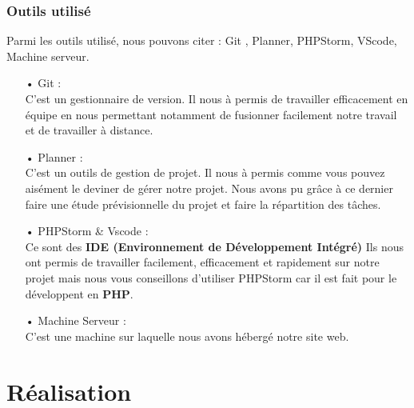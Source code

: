 \documentclass[14pt,a4paper]{article}
\begin{document}
\subsubsection{Outils utilisé}
Parmi les outils utilisé, nous pouvons citer : Git , Planner, PHPStorm, VScode, Machine serveur.
\begin{itemize}
\item[•] Git : \\
C'est un gestionnaire de version. Il nous à permis de travailler efficacement en équipe en nous
permettant notamment de fusionner facilement notre travail et de travailler à distance. 
\item[•] Planner : \\
C'est un outils de gestion de projet. Il nous à permis comme vous pouvez aisément le deviner de 
gérer notre projet. Nous avons pu grâce à ce dernier faire une étude prévisionnelle du projet et faire
la répartition des tâches.
\item[•] PHPStorm \& Vscode : \\
Ce sont des \textbf{IDE (Environnement de Développement Intégré)} Ils nous ont permis de
travailler facilement, efficacement et rapidement sur notre projet mais nous vous conseillons 
d'utiliser PHPStorm car il est fait pour le développent en \textbf{PHP}.
\item[•] Machine Serveur : \\
C'est une machine sur laquelle nous avons hébergé notre site web.
\end{itemize}

\section{Réalisation}
\end{document}
